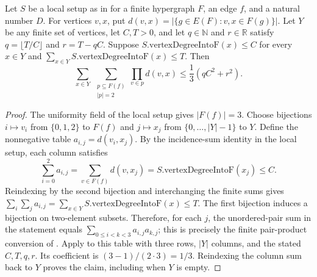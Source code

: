 \begin{lemma}
Let $S$ be a local setup as in 
for a finite hypergraph $F$, an edge $f$, and a natural number $D$.
For vertices $v,x$, put $d(v,x)=|\{g\in E(F):v,x\in F(g)\}|$.
Let $Y$ be any finite set of vertices, let $C,T>0$, and let
$q\in\mathbb N$ and $r\in\mathbb R$ satisfy
$q=\lfloor T/C\rfloor$ and $r=T-qC$.
Suppose $S.\mathrm{vertexDegreeIntoF}(x)\le C$ for every $x\in Y$ and
$\sum_{x\in Y}S.\mathrm{vertexDegreeIntoF}(x)\le T$. Then
\[
\sum_{x\in Y}\ \sum_{\substack{p\subseteq F(f)\\|p|=2}}
\prod_{v\in p}d(v,x)\le \frac13(qC^2+r^2).
\]
\end{lemma}
\begin{proof}
The uniformity field of the local setup gives $|F(f)|=3$.
Choose bijections $i\mapsto v_i$ from $\{0,1,2\}$ to $F(f)$ and
$j\mapsto x_j$ from $\{0,\ldots,|Y|-1\}$ to $Y$.
Define the nonnegative table $a_{i,j}=d(v_i,x_j)$.
By the incidence-sum identity in the local setup, each column satisfies
\[
\sum_{i=0}^2 a_{i,j}
=\sum_{v\in F(f)}d(v,x_j)=S.\mathrm{vertexDegreeIntoF}(x_j)\le C.
\]
Reindexing by the second bijection and interchanging the finite sums gives
$\sum_i\sum_j a_{i,j}=\sum_{x\in Y}S.\mathrm{vertexDegreeIntoF}(x)\le T$.
The first bijection induces a bijection on two-element subsets. Therefore,
for each $j$, the unordered-pair sum in the statement equals
$\sum_{0\le i<k<3}a_{i,j}a_{k,j}$; this is precisely the finite pair-product
conversion of .
Apply  to this table with three rows,
$|Y|$ columns, and the stated $C,T,q,r$. Its coefficient is
$(3-1)/(2\cdot3)=1/3$. Reindexing the column sum back to $Y$ proves the claim,
including when $Y$ is empty.
\end{proof}
